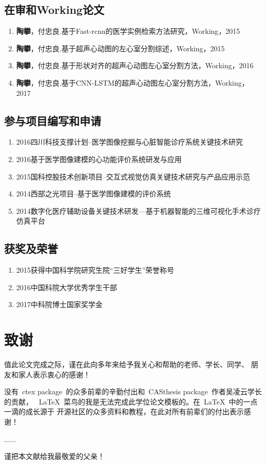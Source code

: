 \section*{在审和Working论文}
\begin{enumerate}
\item{\textbf{陶攀}，付忠良.{基于Fast-rcnn的医学实例检索方法研究}，{Working}，2015}
\item{\textbf{陶攀}，付忠良.{基于超声心动图的左心室分割综述}，{Working}，2015}
\item{\textbf{陶攀}，付忠良.{基于形状对齐的超声心动图左心室分割方法}，{Working}，2016}
\item{\textbf{陶攀}，付忠良.{基于CNN-LSTM的超声心动图左心室分割方法}，{Working}，2017}

\end{enumerate}


\section*{参与项目编写和申请}
\begin{enumerate}
\item{2016}{四川科技支撑计划--医学图像挖掘与心脏智能诊疗系统关键技术研究 }{}
\item{2016}{基于医学图像建模的心功能评价系统研发与应用}{}
\item{2015}{国科控股技术创新项目--交互式视觉仿真关键技术研究与产品应用示范}{}
\item{ 2014}{西部之光项目--基于医学图像建模的评价系统 }{}
\item{2014}{数字化医疗辅助设备关键技术研发—基于机器智能的三维可视化手术诊疗仿真平台}{}
\end{enumerate}
\section*{获奖及荣誉}
\begin{enumerate}
\item{2015}{获得中国科学院研究生院“三好学生”荣誉称号}
\item{2016}{中国科院大学优秀学生干部}
\item{2017}{中科院博士国家奖学金}
\end{enumerate}

\chapter{致\quad 谢}

值此论文完成之际，谨在此向多年来给予我关心和帮助的老师、学长、同学、
朋友和家人表示衷心的感谢！

没有~ctex package~的众多前辈的辛勤付出和~CASthesis package~作者吴凌云学长的贡献，
~\LaTeX{}~菜鸟的我是无法完成此学位论文模板的。在~\LaTeX{}~中的一点一滴的成长源于
开源社区的众多资料和教程，在此对所有前辈们的付出表示感谢！

......

谨把本文献给我最敬爱的父亲！
